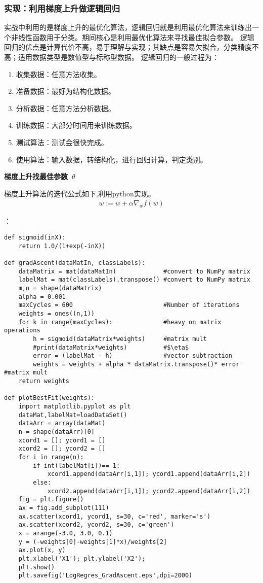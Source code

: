 \subsubsection{实现：利用梯度上升做逻辑回归}
实战中利用的是梯度上升的最优化算法，逻辑回归就是利用最优化算法来训练出一个非线性函数用于分类。期间核心是利用最优化算法来寻找最佳拟合参数。
逻辑回归的优点是计算代价不高，易于理解与实现；其缺点是容易欠拟合，分类精度不高；适用数据类型是数值型与标称型数据。
逻辑回归的一般过程为：
\begin{enumerate}
  \item 收集数据：任意方法收集。
  \item 准备数据：最好为结构化数据。
  \item 分析数据：任意方法分析数据。
  \item 训练数据：大部分时间用来训练数据。
  \item 测试算法：测试会很快完成。
  \item 使用算法：输入数据，转结构化，进行回归计算，判定类别。
\end{enumerate}

\noindent\textbf{梯度上升找最佳参数~$\theta$~}\par
梯度上升算法的迭代公式如下,利用python实现。
\begin{equation}\nonumber
\begin{split}
  w := w +\alpha\nabla_wf(w)
\end{split}
\end{equation}

：
\begin{lstlisting}
def sigmoid(inX):
    return 1.0/(1+exp(-inX))

def gradAscent(dataMatIn, classLabels):
    dataMatrix = mat(dataMatIn)             #convert to NumPy matrix
    labelMat = mat(classLabels).transpose() #convert to NumPy matrix
    m,n = shape(dataMatrix)
    alpha = 0.001
    maxCycles = 600                         #Number of iterations
    weights = ones((n,1))
    for k in range(maxCycles):              #heavy on matrix operations
        h = sigmoid(dataMatrix*weights)     #matrix mult
        #print(dataMatrix*weights)          #$\eta$
        error = (labelMat - h)              #vector subtraction
        weights = weights + alpha * dataMatrix.transpose()* error #matrix mult
    return weights

def plotBestFit(weights):
    import matplotlib.pyplot as plt
    dataMat,labelMat=loadDataSet()
    dataArr = array(dataMat)
    n = shape(dataArr)[0]
    xcord1 = []; ycord1 = []
    xcord2 = []; ycord2 = []
    for i in range(n):
        if int(labelMat[i])== 1:
            xcord1.append(dataArr[i,1]); ycord1.append(dataArr[i,2])
        else:
            xcord2.append(dataArr[i,1]); ycord2.append(dataArr[i,2])
    fig = plt.figure()
    ax = fig.add_subplot(111)
    ax.scatter(xcord1, ycord1, s=30, c='red', marker='s')
    ax.scatter(xcord2, ycord2, s=30, c='green')
    x = arange(-3.0, 3.0, 0.1)
    y = (-weights[0]-weights[1]*x)/weights[2]
    ax.plot(x, y)
    plt.xlabel('X1'); plt.ylabel('X2');
    plt.show()
    plt.savefig('LogRegres_GradAscent.eps',dpi=2000)
\end{lstlisting}

